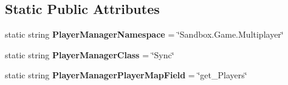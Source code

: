 \subsection*{Static Public Attributes}
\begin{DoxyCompactItemize}
\item 
\hypertarget{class_s_e_mod_a_p_i_internal_1_1_a_p_i_1_1_common_1_1_player_manager_ae11715eeecb7e2816bcdf40aef4904c5}{}static string {\bfseries Player\+Manager\+Namespace} = \char`\"{}Sandbox.\+Game.\+Multiplayer\char`\"{}\label{class_s_e_mod_a_p_i_internal_1_1_a_p_i_1_1_common_1_1_player_manager_ae11715eeecb7e2816bcdf40aef4904c5}

\item 
\hypertarget{class_s_e_mod_a_p_i_internal_1_1_a_p_i_1_1_common_1_1_player_manager_a48f221f69291484855275605505e6425}{}static string {\bfseries Player\+Manager\+Class} = \char`\"{}Sync\char`\"{}\label{class_s_e_mod_a_p_i_internal_1_1_a_p_i_1_1_common_1_1_player_manager_a48f221f69291484855275605505e6425}

\item 
\hypertarget{class_s_e_mod_a_p_i_internal_1_1_a_p_i_1_1_common_1_1_player_manager_a745d9a7c707c7c518457126fa5d7d18f}{}static string {\bfseries Player\+Manager\+Player\+Map\+Field} = \char`\"{}get\+\_\+\+Players\char`\"{}\label{class_s_e_mod_a_p_i_internal_1_1_a_p_i_1_1_common_1_1_player_manager_a745d9a7c707c7c518457126fa5d7d18f}

\end{DoxyCompactItemize}
